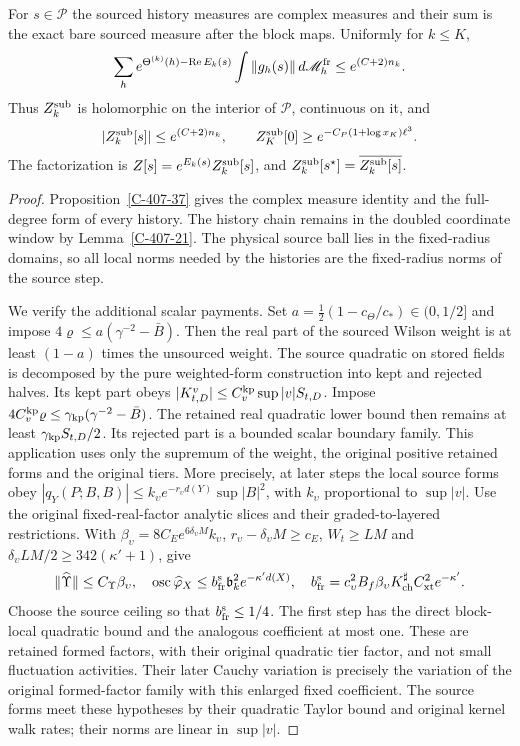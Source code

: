 \documentclass[11pt,letterpaper,reqno]{amsart}
\makeatletter
\theoremstyle{definition}
\newcommand{\ms@minorstart}{%
  \pushQED{\qed}\renewcommand{\qedsymbol}{$\blacksquare$}}
\newenvironment{proposition}[1][]{\ms@minorstart\ms@proposition[#1]}
  {\popQED\endms@proposition}
\theoremstyle{remark}
\makeatother
\begin{document}
\begin{proposition}[All histories at the sources]\label{C-407-22}
For $s\in\mathcal P$ the sourced history measures are
complex measures and their sum is the exact bare sourced
measure after the block maps. Uniformly for $k\le K$,
\[
 \sum_h e^{\Theta^{(k)}(h)-\operatorname{Re}E_k(s)}
       \int\|g_h(s)\|\,d\mathscr M_h^{\rm fr}
 \le e^{(C+2)n_k}.
\]
Thus $Z_k^{\rm sub}$ is holomorphic on the interior of
$\mathcal P$, continuous on it, and
\[
 |Z_k^{\rm sub}[s]|\le e^{(C+2)n_k},\qquad
 Z_K^{\rm sub}[0]\ge e^{-C_P(1+\log x_K)\ell^3}.
\]
The factorization is $Z[s]=e^{E_k(s)}Z_k^{\rm sub}[s]$,
and $Z_k^{\rm sub}[s^\star]=\overline{Z_k^{\rm sub}[s]}$.
\end{proposition}
\begin{proof}
Proposition~\ref{C-407-37} gives the complex measure identity
and the full-degree form of every history. The history chain
remains in the
doubled coordinate window by Lemma~\ref{C-407-21}.
The physical source ball lies in the fixed-radius
domains, so all local norms needed by the histories
are the fixed-radius norms of the source step.

We verify the additional scalar payments. Set
$a=\frac12(1-c_\Theta/c_*)\in(0,1/2]$ and impose
$4\varrho\le a(\gamma^{-2}-\bar B)$.
Then the real part of the sourced Wilson weight is at
least $(1-a)$ times the unsourced weight.
The source quadratic on stored fields is decomposed by
the pure weighted-form construction into kept
and rejected halves. Its kept part obeys
$|K_{t,D}^v|\le C_v^{\rm kp}\sup|v|S_{t,D}$.
Impose
$4C_v^{\rm kp}\varrho\le\gamma_{\rm kp}(\gamma^{-2}-\bar B)$.
The retained real quadratic lower bound then remains
at least $\gamma_{\rm kp}S_{t,D}/2$. Its rejected part
is a bounded scalar boundary family. This application
uses only the supremum of the weight, the original
positive retained forms and the original tiers.
More precisely, at later steps the local source forms
obey $|q_Y(P;B,B)|\le k_\upsilon e^{-r_\upsilon d(Y)}
\sup|B|^2$, with $k_\upsilon$ proportional to $\sup|v|$.
Use the original fixed-real-factor analytic slices and
their graded-to-layered restrictions. With
$\beta_\upsilon=8C_Ee^{6\delta_\upsilon M}k_\upsilon$,
$r_\upsilon-\delta_\upsilon M\ge c_E$,
$W_t\ge LM$ and
$\delta_\upsilon LM/2\ge342(\kappa'+1)$,
\cite[Theorem~AG and Proposition~79.3]{YMM1} give
\[
 \|\widehat\Upsilon\|\le C_\Upsilon\beta_\upsilon,
 \quad \operatorname{osc}\widehat\varphi_X
 \le b_{\rm fr}^{\rm s}\mathfrak b_k^2e^{-\kappa'd(X)},
 \quad b_{\rm fr}^{\rm s}
 =c_\upsilon^2B_f\beta_\upsilon K_{\rm ch}^\sharp
 C_{\rm xt}^2e^{-\kappa'}.
\]
Choose the source ceiling so that $b_{\rm fr}^{\rm s}\le1/4$.
The first step has the direct block-local quadratic bound
and the analogous coefficient at most one. These are
retained formed factors, with their original quadratic
tier factor, and not small fluctuation activities.
Their later Cauchy variation is precisely the variation
of the original formed-factor family with this enlarged
fixed coefficient. The source forms meet these hypotheses
by their quadratic Taylor bound and original kernel walk
rates; their norms are linear in $\sup|v|$.


\end{proof}
\end{document}
